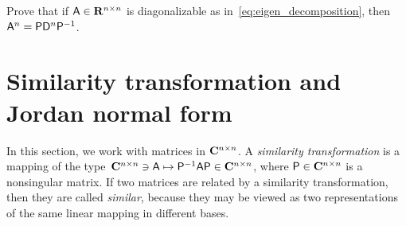 \begin{exercise}
    Prove that if $\mathsf A \in \mathbf R^{n \times n}$ is diagonalizable as in~\eqref{eq:eigen_decomposition},
    then $\mathsf A^n = \mathsf P \mathsf D^n \mathsf P^{-1}$.
\end{exercise}

\section{Similarity transformation and Jordan normal form}%
\label{sec:similarity_transformation_and_jordan_normal_form}
In this section, we work with matrices in $\mathbf C^{n \times n}$.
A \emph{similarity transformation} is a mapping of the type~$\mathbf C^{n \times n} \ni \mathsf A \mapsto \mathsf P^{-1} \mathsf A \mathsf P \in \mathbf C^{n \times n}$,
where $\mathsf P \in \mathbf C^{n \times n}$ is a nonsingular matrix.
If two matrices are related by a similarity transformation,
then they are called \emph{similar},
because they may be viewed as two representations of the same linear mapping in different bases.

